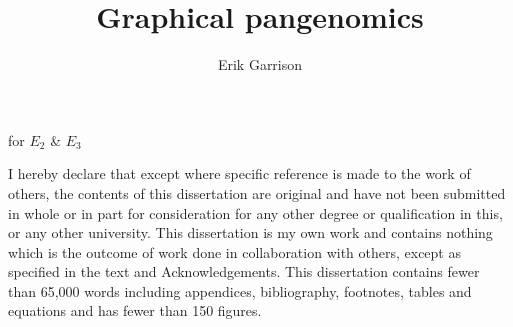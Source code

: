 \documentclass[a4paper,12pt,numbered,oneside]{Classes/PhDThesisPSnPDF}
\title{Graphical pangenomics}
\author{Erik Garrison}
\begin{document}
\frontmatter

\maketitle

%

\begin{dedication} 

for $E_2$ \& $E_3$

\end{dedication}


%

\begin{declaration}

I hereby declare that except where specific reference is made to the work of 
others, the contents of this dissertation are original and have not been 
submitted in whole or in part for consideration for any other degree or 
qualification in this, or any other university. This dissertation is my own 
work and contains nothing which is the outcome of work done in collaboration 
with others, except as specified in the text and Acknowledgements. This 
dissertation contains fewer than 65,000 words including appendices, 
bibliography, footnotes, tables and equations and has fewer than 150 figures.


\end{declaration}


%
\end{document}
